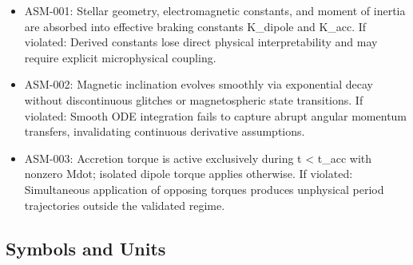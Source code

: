\documentclass[11pt]{article}
\begin{document}
\begin{itemize}
\item ASM-001: Stellar geometry, electromagnetic constants, and moment of inertia are absorbed into effective braking constants K\_dipole and K\_acc. If violated: Derived constants lose direct physical interpretability and may require explicit microphysical coupling.
\item ASM-002: Magnetic inclination evolves smoothly via exponential decay without discontinuous glitches or magnetospheric state transitions. If violated: Smooth ODE integration fails to capture abrupt angular momentum transfers, invalidating continuous derivative assumptions.
\item ASM-003: Accretion torque is active exclusively during t < t\_acc with nonzero Mdot; isolated dipole torque applies otherwise. If violated: Simultaneous application of opposing torques produces unphysical period trajectories outside the validated regime.
\end{itemize}

\subsection{Symbols and Units}
\end{document}
